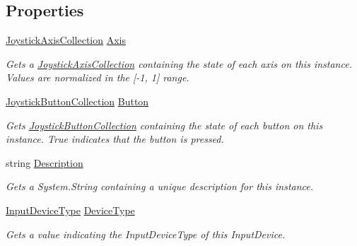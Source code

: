 \subsection*{Properties}
\begin{DoxyCompactItemize}
\item 
\hyperlink{class_open_t_k_1_1_input_1_1_joystick_axis_collection}{Joystick\-Axis\-Collection} \hyperlink{class_open_t_k_1_1_input_1_1_joystick_device_a21ae34496707cad92024def6a122e878}{Axis}
\begin{DoxyCompactList}\small\item\em Gets a \hyperlink{class_open_t_k_1_1_input_1_1_joystick_axis_collection}{Joystick\-Axis\-Collection} containing the state of each axis on this instance. Values are normalized in the \mbox{[}-\/1, 1\mbox{]} range. \end{DoxyCompactList}\item 
\hyperlink{class_open_t_k_1_1_input_1_1_joystick_button_collection}{Joystick\-Button\-Collection} \hyperlink{class_open_t_k_1_1_input_1_1_joystick_device_afab123d1de6fce4b1ce79a8480d6bc4b}{Button}
\begin{DoxyCompactList}\small\item\em Gets \hyperlink{class_open_t_k_1_1_input_1_1_joystick_button_collection}{Joystick\-Button\-Collection} containing the state of each button on this instance. True indicates that the button is pressed. \end{DoxyCompactList}\item 
string \hyperlink{class_open_t_k_1_1_input_1_1_joystick_device_ae04707b3c97c5aeedde335995c1821f6}{Description}
\begin{DoxyCompactList}\small\item\em Gets a System.\-String containing a unique description for this instance. \end{DoxyCompactList}\item 
\hyperlink{namespace_open_t_k_1_1_input_a1d147c6256b0adaa5288eec90ed93270}{Input\-Device\-Type} \hyperlink{class_open_t_k_1_1_input_1_1_joystick_device_af1eddeb505296cf4a598090113b1f5df}{Device\-Type}
\begin{DoxyCompactList}\small\item\em Gets a value indicating the Input\-Device\-Type of this Input\-Device. \end{DoxyCompactList}\end{DoxyCompactItemize}


